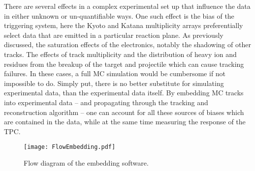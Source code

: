 There are several effects in a complex experimental set up that influence the data in either unknown or un-quantifiable ways. One such effect is the bias of the triggering system, here the Kyoto and Katana multiplicity arrays preferentially select data that are emitted in a particular reaction plane. As previously discussed, the saturation effects of the electronics, notably the shadowing of other tracks. The effects of track multiplicity and the distribution of heavy ion and residues from the breakup of the target and projectile which can cause tracking failures. In these cases, a full MC simulation would be cumbersome if not impossible to do. Simply put, there is no better substitute for simulating experimental data, than the experimental data itself. By embedding MC tracks into experimental data -- and propagating through the tracking and reconstruction algorithm -- one can account for all these sources of biases which are contained in the data, while at the same time measuring the response of the TPC.







\begin{figure}[!htb]
\centering
\texttt{[image: FlowEmbedding.pdf]}
\caption{Flow diagram of the embedding software.}
\label{fig:flow}
\end{figure}


